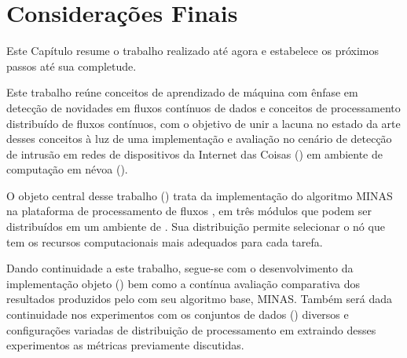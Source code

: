\chapter{Considerações Finais}\label{cha:final}

\begin{resumocap}
  Este Capítulo resume o trabalho realizado até agora e estabelece
  os próximos passos até sua completude.
\end{resumocap}

Este trabalho reúne conceitos de aprendizado de máquina com ênfase em detecção
de novidades em fluxos contínuos de dados e conceitos de processamento
distribuído de fluxos contínuos, com o objetivo de unir a lacuna no estado da
arte desses conceitos à luz de uma implementação e avaliação no cenário de
detecção de intrusão em redes de dispositivos da Internet das Coisas (\iot) em
ambiente de computação em névoa (\fog).

O objeto central desse trabalho (\mfog) trata da implementação do algoritmo MINAS na
plataforma de processamento de fluxos \flink, em três módulos que podem ser
distribuídos em um ambiente de \fog.
Sua distribuição permite selecionar o nó que tem os recursos computacionais mais
adequados para cada tarefa.


Dando continuidade a este trabalho, segue-se com o desenvolvimento da implementação objeto
(\mfog) bem como a contínua avaliação comparativa dos resultados
produzidos pelo \mfog com seu algoritmo base, MINAS.
Também será dada continuidade nos experimentos com os conjuntos de dados (\datasets)
diversos e configurações variadas de distribuição de processamento em \fog
extraindo desses experimentos as métricas previamente discutidas.





